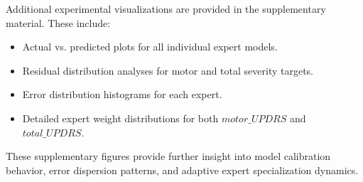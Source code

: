 \documentclass{customIEEEsingle}
\begin{document}
	Additional experimental visualizations are provided in the supplementary material. These include:
	
	\begin{itemize}
		\item Actual vs. predicted plots for all individual expert models.
		\item Residual distribution analyses for motor and total severity targets.
		\item Error distribution histograms for each expert.
		\item Detailed expert weight distributions for both $motor\_UPDRS$ and $total\_UPDRS$.
	\end{itemize}
	
	These supplementary figures provide further insight into model calibration behavior, error dispersion patterns, and adaptive expert specialization dynamics.
	
	
\end{document}
